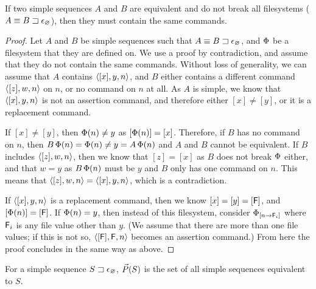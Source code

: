 \begin{mylem}
If two simple sequences $A$ and $B$ are equivalent
and do not break all filesystems ($A\equiv {B}\sqsupset\epsilon_\varnothing$),
then they must contain the same commands.
\end{mylem}
\begin{proof}
Let $A$ and $B$ be simple sequences
such that $A\equiv {B}\sqsupset\epsilon_\varnothing$,
and $\Phi$ be a filesystem that they are defined on.
We use a proof by contradiction, and assume that they do not contain the same commands.
Without loss of generality, we can assume
that $A$
contains $\langle{[x],y,n}\rangle$, and $B$ either contains a different command
$\langle{[z],w,n}\rangle$ on $n$, or no command on $n$ at all.
As $A$ is simple, we know that $\langle{[x],y,n}\rangle$ is not an assertion command,
and therefore either $[x]\neq [y]$, or it is a replacement command.

If $[x]\neq [y]$, then $\Phi(n)\neq y$ as $[\Phi(n)]=[x]$.
Therefore, if $B$ has no command on $n$, then $B\,\Phi(n)=\Phi(n)\neq y=A\,\Phi(n)$ and
$A$ and $B$ cannot be equivalent.
If $B$ includes $\langle{[z],w,n}\rangle$, then we know that $[z]=[x]$ as $B$ does not break $\Phi$ either,
and that $w=y$ as $B\,\Phi(n)$ must
be $y$ and $B$ only has one command on $n$.
This means that $\langle{[z],w,n}\rangle=\langle{[x],y,n}\rangle$, which is a contradiction.

If $\langle{[x],y,n}\rangle$ is a replacement command, then we know $[x]=[y]=[\mathsf{F}]$, and
$[\Phi(n)]=[\mathsf{F}]$. If $\Phi(n)=y$, then instead of this filesystem,
consider ${\Phi}_{[{n}\rightarrow{\mathsf{F}_i}]}$ where $\mathsf{F}_i$ is any file value
other than $y$.
(We assume that there are more than one file values; if this is not so,
$\langle{[\mathsf{F}],\mathsf{F},n}\rangle$ becomes an assertion command.)
From here the proof concludes in the same way as above.
\end{proof}


\begin{mylem}
For a simple sequence ${S}\sqsupset\epsilon_\varnothing$,
$\vec{P}({S})$ is the set of all simple sequences equivalent to $S$.
\end{mylem}

